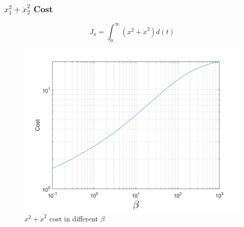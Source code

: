 \subsubsection{$x_1^2 + \dot x_2^2$ Cost}
$$J_u = \int_{0}^{\infty} (x^2 + \dot{x}^2)d(t)$$
\begin{figure}[H]
	\caption{$x^2 + \dot{x}^2$ cost in different $\beta$}
	\centering
	\includegraphics[width=12cm]{../Code/Q3/figures/xCost.png}
\end{figure}